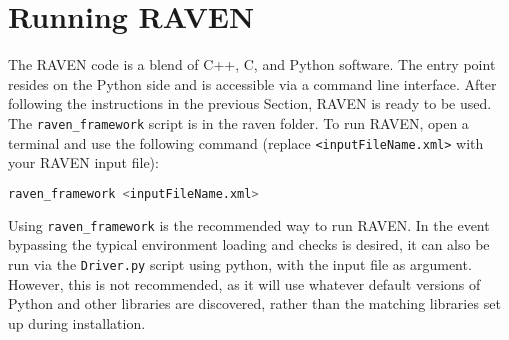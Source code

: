 \section{Running RAVEN}
\label{HowToRun}

The RAVEN code is a blend of C++, C, and Python software. The entry point
resides on the Python side and is accessible via a command line interface.
%
After following the instructions in the previous Section, RAVEN is ready to be
used.
%
The \texttt{raven\_framework} script is in the raven folder.
%
To run RAVEN, open a terminal and use the following command (replace \texttt{<inputFileName.xml>} with your RAVEN input file):

\begin{lstlisting}[language=bash]
raven_framework <inputFileName.xml>
\end{lstlisting}

Using \texttt{raven\_framework} is the recommended way to run RAVEN.  In the event bypassing the typical
environment loading and checks is desired, it can also be run via
the \texttt{Driver.py} script using python, with the input file as argument.  However, this is not
recommended, as it will use whatever default versions of Python and other libraries are discovered, rather
than the matching libraries set up during installation.
